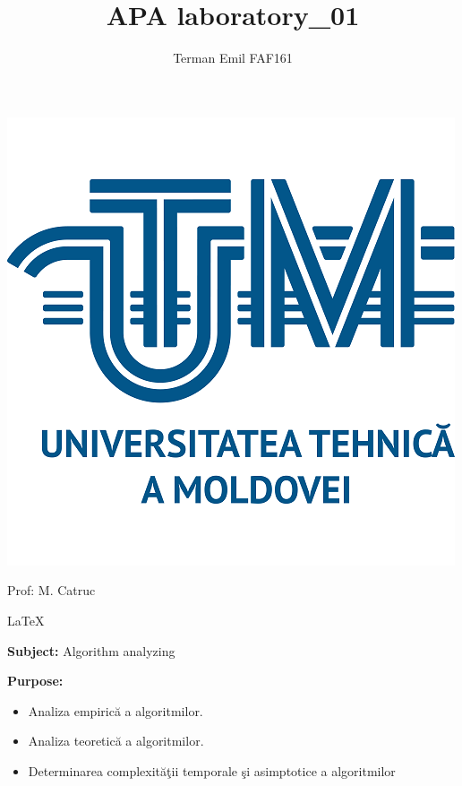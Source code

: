 \documentclass{article}
\begin{document}

	\makeatletter
	\newenvironment{sqcases} {
		\matrix@check\sqcases\env@sqcases
	}{
		\endarray \right.
	}
	\def\env@sqcases {
		\let \@ifnextchar \new@ifnextchar
		\left \lbrack
		\def \arraystretch{1.2}
		\array{@{}l@{\quad}l@{}}
	}
	\makeatother


	\title{APA laboratory\_01}
	\author{Terman Emil FAF161}
	\maketitle

	\vspace*{\fill}
	
	\centering
	\includegraphics{imgs/UTM_logo.png}

	\begin{flushright}
		Prof: M. Catruc
	\end{flushright}

	\LaTeX
	\pagebreak

	\centering
	{\Huge \textbf{Subject:} Algorithm analyzing}
	
	\raggedright
	{\large \textbf{Purpose:}}
	\begin{itemize}
		\item Analiza empirică a algoritmilor.
		\item Analiza teoretică a algoritmilor.
		\item Determinarea complexităţii temporale şi asimptotice a algoritmilor
	\end{itemize}
\end{document}
